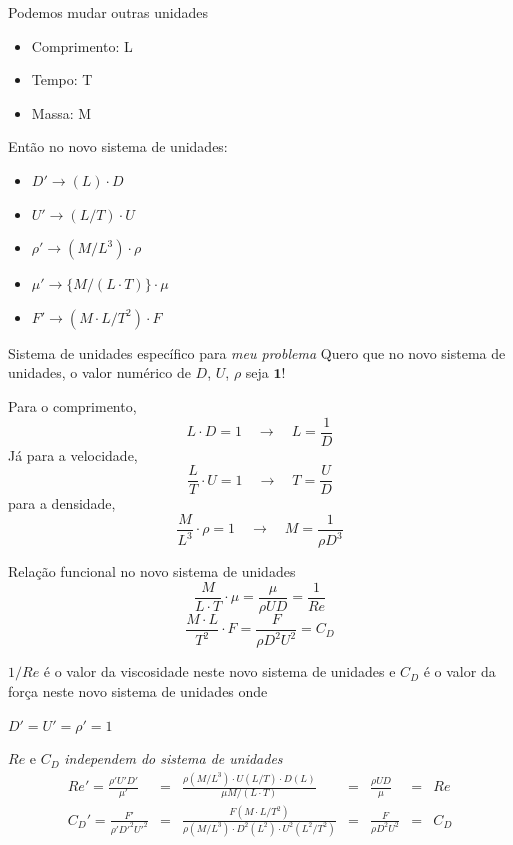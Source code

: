 \documentclass{beamer}
\newcommand{\pr}[1]{\ensuremath{ \mathbf{#1}}}    %
\newcommand{\lra}{\ensuremath{\longrightarrow}}
\newcommand{\p}[1]{\ensuremath{ \mathbf{#1}}}    %
\newcommand{\qrq}{\ensuremath{\quad\lra\quad}}
\begin{document}
\begin{frame}{Podemos mudar outras unidades}
  \begin{itemize}
  \item Comprimento: L
  \item Tempo: T
  \item Massa: M
  \end{itemize}
Então no novo sistema de unidades:
\begin{itemize}
\item $D' \lra (L) \cdot D$
\item $U' \lra (L/T) \cdot U$
\item $\rho' \lra  (M/L^3) \cdot\rho$
\item $\mu' \lra \{M/(L\cdot T)\}\cdot\mu$
\item $F' \lra (M \cdot L / T^2) \cdot F$
\end{itemize}
  
\end{frame}



\begin{frame}{Sistema de unidades específico para \emph{meu problema}}
  Quero que no novo sistema de unidades, o valor numérico de $D$, $U$, $\rho$ seja $\p{1}$!
  
Para o comprimento,
\[
L \cdot D = 1 \qrq L = \frac{1}{D}
\]
Já para a velocidade,
\[
\frac{L}{T} \cdot U = 1 \qrq T = \frac{U}{D}
\]
para a densidade,
\[
\frac{M}{L^3} \cdot \rho = 1 \qrq M = \frac{1}{\rho D^3}
\]
  
\end{frame}


\begin{frame}{Relação funcional no novo sistema de unidades}
  \[
\frac{M}{L\cdot T} \cdot \mu = \frac{\mu}{\rho U D} = \frac{1}{Re}
\]
\[
\frac{M\cdot L}{T^2} \cdot F = \frac{F}{\rho D^2 U^2} = C_D
\]

$1/Re$ é o valor da viscosidade neste novo sistema de unidades e 
$C_D$ é o valor da força neste novo sistema de unidades onde

$D' = U' = \rho' = 1$

\end{frame}

\begin{frame}{$Re$ e $C_D$ \emph{independem do sistema de unidades}}
\[
\begin{aligned}
Re' = \frac{\rho' U' D'}{\mu'} &=& \frac{\rho (M/L^3) \cdot U (L/T) \cdot D (L) }{\mu M/(L\cdot T)} &=& \frac{\rho U D}{\mu} &=& Re \\
C_D' = \frac{F'}{\rho' D'^2 U'^2} &=& \frac{F (M\cdot L/T^2)}{\rho (M/L^3) \cdot D^2 (L^2) \cdot U^2 (L^2/T^2)} &=& \frac{F}{\rho D^2 U^2} &=& C_D  \\
\end{aligned}
\]
\end{frame}
\end{document}
